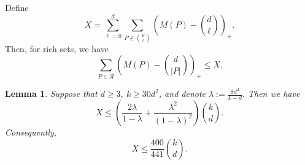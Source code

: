 \documentclass[11pt]{article}
\numberwithin{equation}{section}
\newtheorem{lemma}[theorem]{Lemma}
\begin{document}
	Define
	\begin{equation}\label{eq:X-def}
		X=
		\sum_{\ell=0}^{d}
		\sum_{P\in\binom{E}{\ell}}
		\left(M(P)-\binom{d}{\ell}\right)_+.
	\end{equation}
	Then, for rich sets, we have
	\begin{equation}\label{eq:rich-le-X}
		\sum_{P\in\mathcal R}
		\left(M(P)-\binom{d}{|P|}\right)_+
		\le X.
	\end{equation}
	\begin{lemma}\label{lem:layer-cake}
		Suppose that $d\ge 3$, $k\ge 30d^2$, and denote
	$
		\lambda:=\frac{8d^2}{k-d}.
	$
		Then we have
		\[
		X
		\le
		\left(
		\frac{2\lambda}{1-\lambda}
		+
		\frac{\lambda^2}{(1-\lambda)^2}
		\right)
		\binom{k}{d}.
		\]
		Consequently,
		\[
		X\le \frac{400}{441}\binom{k}{d}.
		\]
	\end{lemma}
\end{document}
